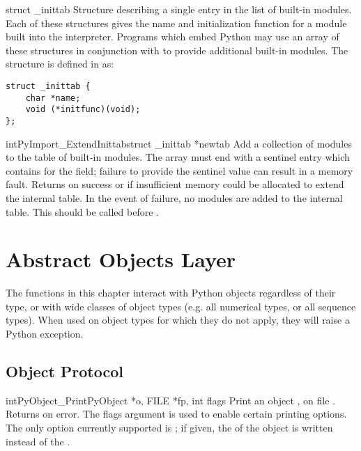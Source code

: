 \documentclass{manual}
\begin{document}
\begin{ctypedesc}[_inittab]{struct _inittab}
Structure describing a single entry in the list of built-in modules.
Each of these structures gives the name and initialization function
for a module built into the interpreter.  Programs which embed Python
may use an array of these structures in conjunction with
 to provide additional built-in
modules.  The structure is defined in  as:

\begin{verbatim}
struct _inittab {
    char *name;
    void (*initfunc)(void);
};
\end{verbatim}
\end{ctypedesc}

\begin{cfuncdesc}{int}{PyImport_ExtendInittab}{struct _inittab *newtab}
Add a collection of modules to the table of built-in modules.  The
 array must end with a sentinel entry which contains
\NULL{} for the  field; failure to provide the sentinel
value can result in a memory fault.  Returns  on success or
 if insufficient memory could be allocated to extend the
internal table.  In the event of failure, no modules are added to the
internal table.  This should be called before
.
\end{cfuncdesc}


\chapter{Abstract Objects Layer \label{abstract}}

The functions in this chapter interact with Python objects regardless
of their type, or with wide classes of object types (e.g. all
numerical types, or all sequence types).  When used on object types
for which they do not apply, they will raise a Python exception.

\section{Object Protocol \label{object}}

\begin{cfuncdesc}{int}{PyObject_Print}{PyObject *o, FILE *fp, int flags}
Print an object , on file .  Returns  on error.
The flags argument is used to enable certain printing options.  The
only option currently supported is ; if given,
the  of the object is written instead of the
.
\end{cfuncdesc}
\end{document}
